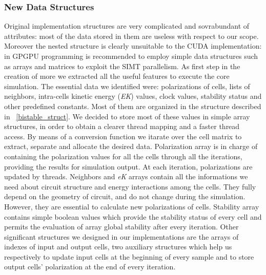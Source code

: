 \subsubsection{New Data Structures}
Original implementation structures are very complicated and sovrabundant of attributes: most of the data stored in them are useless with 
respect to our scope. Moreover the nested structure is clearly unsuitable to the CUDA implementation: in GPGPU programming is 
recommended to employ simple data structures such as arrays and matrices to exploit the SIMT parallelism. 
 As first step in the creation of more we extracted all the useful features to execute the core simulation.
The essential data we identified were: polarizations of cells, lists of neighbors, intra-cells kinetic energy (\textit{EK}) values, clock 
values, stability status and other predefined constants. Most of them are organized in the structure described in 
\lstlistingname~\ref{bistable_struct}.\newline
We decided to store most of these values in simple array structures, in order to obtain a clearer thread mapping and a faster thread 
access. By means of a conversion function we itarate over the cell matrix to extract, separate and allocate the desired data.\newline
Polarization array is in charge of containing the polarization values for all the cells through all the iterations, providing
the results for simulation output. At each iteration, polarizations are updated by threads.\newline
Neighbors and \textit{eK} arrays contain all the informations we need about circuit structure and energy interactions among
the cells. They fully depend on the geometry of circuit, and do not change during the simulation. However, they are essential to calculate 
new polarizations of cells.\newline
Stability array contains simple boolean values which provide the stability status of every cell and permits the evaluation of array global
stability after every iteration.\newline
Other significant structures we designed in our implementations are the arrays of indexes of input and output cells, two auxiliary structures
which help us respectively to update input cells at the beginning of every sample and to store output cells' polarization at the end of 
every iteration.\newline




